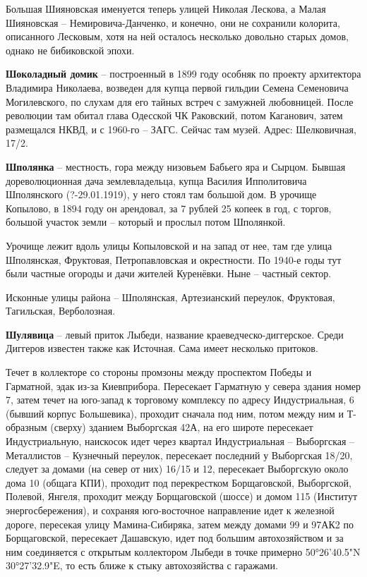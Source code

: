 Большая Шияновская именуется теперь улицей Николая Лескова, а Малая Шияновская – Немировича-Данченко, и конечно, они не сохранили колорита, описанного Лесковым, хотя на ней осталось несколько довольно старых домов, однако не бибиковской эпохи.\\

\medskip

\textbf{Шоколадный домик} – построенный в 1899 году особняк по проекту архитектора Владимира Николаева, возведен для купца первой гильдии Семена Семеновича Могилевского, по слухам для его тайных встреч с замужней любовницей. После революции там обитал глава Одесской ЧК Раковский, потом Каганович, затем размещался НКВД, и с 1960-го – ЗАГС. Сейчас там музей. Адрес: Шелковичная, 17/2.\\

\medskip

\textbf{Шполянка} – местность, гора между низовьем Бабьего яра и Сырцом. Бывшая дореволюционная дача землевладельца, купца Василия Ипполитовича Шполянского (?-29.01.1919), у него стоял там большой дом. В урочище Копылово, в 1894 году он арендовал, за 7 рублей 25 копеек в год, с торгов, большой участок земли – который и прослыл потом Шполянкой.

Урочище лежит вдоль улицы Копыловской и на запад от нее, там где улица Шполянская, Фруктовая, Петропавловская и окрестности. По 1940-е годы тут были частные огороды и дачи жителей Куренёвки. Ныне – частный сектор.

Исконные улицы района – Шполянская, Артезианский переулок, Фруктовая, Тагильская, Верболозная.\\

\medskip

\textbf{Шулявица} – левый приток Лыбеди, название краеведческо-диггерское. Среди Диггеров известен также как Источная. Сама имеет нес\-колько притоков.

Течет в коллекторе со стороны промзоны между проспектом Победы и Гарматной, эдак из-за Киевприбора. Пересекает Гарматную у севера здания номер 7, затем течет на юго-запад к торговому комплексу по адресу Индустриальная, 6 (бывший корпус Большевика), проходит сначала под ним, потом между ним и Т-образным (сверху) зданием Выборгская 42А, на его широте пересекает Индус\-триальную, наискосок идет через квартал Ин\-дустриальная – Выборгская – Металлистов – Кузнечный переулок, пересекает последний у Выборгская 18/20, следует за домами (на север от них) 16/15 и 12, пересекает Выборгскую около дома 10 (общага КПИ), проходит под перекрестком Борщаговской, Выборгской, Полевой, Янгеля, проходит между Борщаговской (шоссе) и домом 115 (Институт энергосбережения), и сохраняя юго-восточное направление идет к железной дороге, пересекая улицу Мамина-Сибиряка, затем между домами 99 и 97АК2 по Борщаговской, пересекает Дашавскую, идет под большим автохозяйством и за ним соединяется с открытым коллектором Лыбеди в точке примерно 50°26'40.5"N 30°27'32.9"E, то есть ближе к стыку автохозяйства с гаражами.\\


